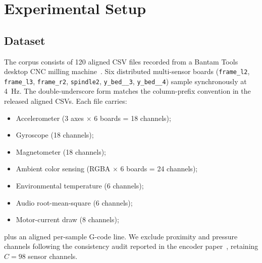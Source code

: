 \documentclass[sensors,article,submit,moreauthors,pdftex]{Definitions/mdpi}
\begin{document}
\section{Experimental Setup}
\label{sec:setup}

\subsection{Dataset}
\label{sec:dataset}

The corpus consists of 120 aligned CSV files recorded from a Bantam Tools desktop CNC milling machine~\cite{encoder_paper}. Six distributed multi-sensor boards (\texttt{frame\_l2}, \texttt{frame\_l3}, \texttt{frame\_r2}, \texttt{spindle2}, \texttt{y\_bed\_\_3}, \texttt{y\_bed\_\_4}) sample synchronously at 4~Hz. The double-underscore form matches the column-prefix convention in the released aligned CSVs. Each file carries:
\begin{itemize}
\item Accelerometer (3 axes $\times$ 6 boards = 18 channels);
\item Gyroscope (18 channels);
\item Magnetometer (18 channels);
\item Ambient color sensing (RGBA $\times$ 6 boards = 24 channels);
\item Environmental temperature (6 channels);
\item Audio root-mean-square (6 channels);
\item Motor-current draw (8 channels);
\end{itemize}
plus an aligned per-sample G-code line. We exclude proximity and pressure channels following the consistency audit reported in the encoder paper~\cite{encoder_paper}, retaining $C=98$ sensor channels.
\end{document}
